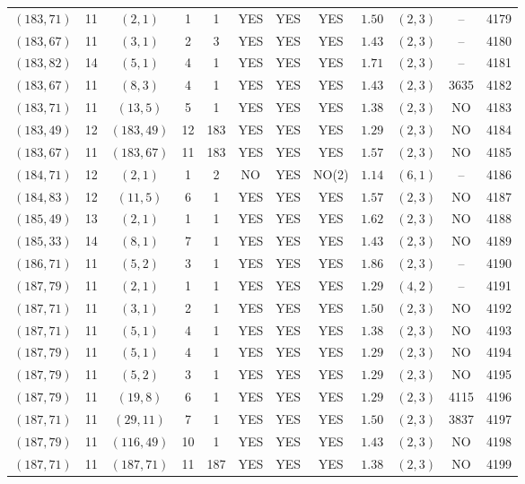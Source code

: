 \begin{longtable}{|c|c|c|c|c|c|c|c|c|c|c|c|}
$(183,71)$ & 11 & $(2,1)$ & 1 & 1 & YES & YES & YES & $1.50$ & $(2,3)$ & -- & 4179\\
$(183,67)$ & 11 & $(3,1)$ & 2 & 3 & YES & YES & YES & $1.43$ & $(2,3)$ & -- & 4180\\
$(183,82)$ & 14 & $(5,1)$ & 4 & 1 & YES & YES & YES & $1.71$ & $(2,3)$ & -- & 4181\\
$(183,67)$ & 11 & $(8,3)$ & 4 & 1 & YES & YES & YES & $1.43$ & $(2,3)$ & 3635 & 4182\\
$(183,71)$ & 11 & $(13,5)$ & 5 & 1 & YES & YES & YES & $1.38$ & $(2,3)$ & NO & 4183\\
$(183,49)$ & 12 & $(183,49)$ & 12 & 183 & YES & YES & YES & $1.29$ & $(2,3)$ & NO & 4184\\
$(183,67)$ & 11 & $(183,67)$ & 11 & 183 & YES & YES & YES & $1.57$ & $(2,3)$ & NO & 4185\\
$(184,71)$ & 12 & $(2,1)$ & 1 & 2 & NO & YES & NO(2) & $1.14$ & $(6,1)$ & -- & 4186\\
$(184,83)$ & 12 & $(11,5)$ & 6 & 1 & YES & YES & YES & $1.57$ & $(2,3)$ & NO & 4187\\
$(185,49)$ & 13 & $(2,1)$ & 1 & 1 & YES & YES & YES & $1.62$ & $(2,3)$ & NO & 4188\\
$(185,33)$ & 14 & $(8,1)$ & 7 & 1 & YES & YES & YES & $1.43$ & $(2,3)$ & NO & 4189\\
$(186,71)$ & 11 & $(5,2)$ & 3 & 1 & YES & YES & YES & $1.86$ & $(2,3)$ & -- & 4190\\
$(187,79)$ & 11 & $(2,1)$ & 1 & 1 & YES & YES & YES & $1.29$ & $(4,2)$ & -- & 4191\\
$(187,71)$ & 11 & $(3,1)$ & 2 & 1 & YES & YES & YES & $1.50$ & $(2,3)$ & NO & 4192\\
$(187,71)$ & 11 & $(5,1)$ & 4 & 1 & YES & YES & YES & $1.38$ & $(2,3)$ & NO & 4193\\
$(187,79)$ & 11 & $(5,1)$ & 4 & 1 & YES & YES & YES & $1.29$ & $(2,3)$ & NO & 4194\\
$(187,79)$ & 11 & $(5,2)$ & 3 & 1 & YES & YES & YES & $1.29$ & $(2,3)$ & NO & 4195\\
$(187,79)$ & 11 & $(19,8)$ & 6 & 1 & YES & YES & YES & $1.29$ & $(2,3)$ & 4115 & 4196\\
$(187,71)$ & 11 & $(29,11)$ & 7 & 1 & YES & YES & YES & $1.50$ & $(2,3)$ & 3837 & 4197\\
$(187,79)$ & 11 & $(116,49)$ & 10 & 1 & YES & YES & YES & $1.43$ & $(2,3)$ & NO & 4198\\
$(187,71)$ & 11 & $(187,71)$ & 11 & 187 & YES & YES & YES & $1.38$ & $(2,3)$ & NO & 4199\\

\end{longtable}
